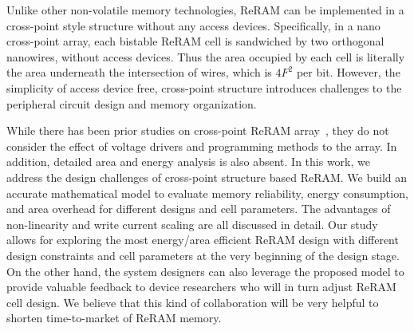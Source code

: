 Unlike other non-volatile memory technologies, ReRAM can be implemented in
a cross-point style structure without any access devices. Specifically, in
a nano cross-point array, each bistable ReRAM cell is sandwiched by two
orthogonal nanowires, without access devices. Thus the area occupied by
each cell is literally the area underneath the intersection of wires,
which is $4F^2$ per bit. However, the simplicity of access device free,
cross-point structure introduces challenges to the peripheral circuit
design and memory organization.

While there has been prior studies on cross-point ReRAM
array~\cite{crossbar_NANO2002_Ziegler,crossbar_NANO08_Flocke,crossbar_TED_2010,crossbar_NANO2003_Ziegler},
they do not consider the effect of voltage drivers and programming methods
to the array. In addition, detailed area and energy analysis is also
absent. In this work, we address the design challenges of cross-point
structure based ReRAM. We build an accurate mathematical model to evaluate
memory reliability, energy consumption, and area overhead for different
designs and cell parameters. The advantages of non-linearity and write
current scaling are all discussed in detail. Our study allows for
exploring the most energy/area efficient ReRAM design with different
design constraints and cell parameters at the very beginning of the design
stage. On the other hand, the system designers can also leverage the
proposed model to provide valuable feedback to device researchers who will
in turn adjust ReRAM cell design. We believe that this kind of
collaboration will be very helpful to shorten time-to-market of ReRAM
memory.

